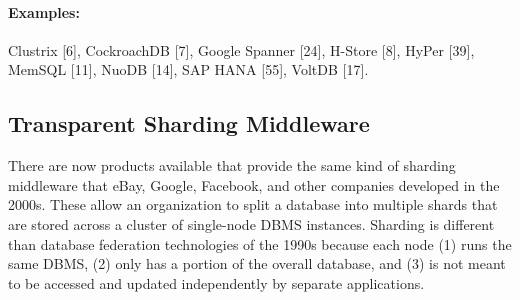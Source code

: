 \documentclass[a4paper,12pt,notitlepage,twoside,openright]{article}
\begin{document}
\paragraph*{Examples:} Clustrix {[}6{]}, CockroachDB {[}7{]}, Google Spanner
{[}24{]}, H-Store {[}8{]}, HyPer {[}39{]}, MemSQL {[}11{]}, NuoDB
{[}14{]}, SAP HANA {[}55{]}, VoltDB {[}17{]}.

\hypertarget{transparent-sharding-middleware}{%
\subsection{Transparent Sharding
Middleware}\label{transparent-sharding-middleware}}

There are now products available that provide the same kind of sharding
middleware that eBay, Google, Facebook, and other companies developed in
the 2000s. These allow an organization to split a database into multiple
shards that are stored across a cluster of single-node DBMS instances.
Sharding is different than database federation technologies of the 1990s
because each node (1) runs the same DBMS, (2) only has a portion of the
overall database, and (3) is not meant to be accessed and updated
independently by separate applications.
\end{document}
